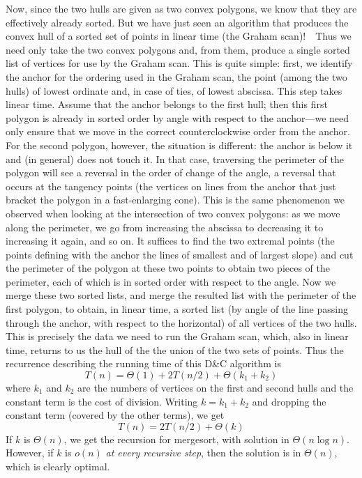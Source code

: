 \documentclass[11pt]{article}
\begin{document}
Now, since the two hulls are given as two convex polygons, we know that
they are effectively already sorted.  But we have just seen an algorithm
that produces the convex hull of a sorted set of points in linear time
(the Graham scan)!\ \  Thus we need only take the two convex polygons
and, from them, produce a single sorted list of vertices for use by the
Graham scan.  This is quite simple: first, we identify the anchor for the
ordering used in the Graham scan, the point (among the two hulls) of lowest
ordinate and, in case of ties, of lowest abscissa.  This step takes linear
time.  Assume that the anchor belongs to the first hull; then this first
polygon is already in sorted order by angle with respect to the anchor---we
need only ensure that we move in the correct counterclockwise order from the
anchor.  For the second polygon, however, the situation is different:
the anchor is below it and (in general) does not touch it.  In that case,
traversing the perimeter of the polygon will see a reversal in the order of
change of the angle, a reversal that occurs at the tangency points (the vertices
on lines from the anchor that just bracket the polygon in a fast-enlarging
cone).  This is the same phenomenon we observed when looking at the intersection
of two convex polygons: as we move along the perimeter, we go from increasing
the abscissa to decreasing it to increasing it again, and so on.  It suffices
to find the two extremal points (the points defining with the anchor the
lines of smallest and of largest slope) and cut the perimeter of the polygon
at these two points to obtain two pieces of the perimeter, each of which
is in sorted order with respect to the angle.  Now we merge these two
sorted lists, and merge the resulted list with the perimeter of the first
polygon, to obtain, in linear time, a sorted list (by angle of the line
passing through the anchor, with respect to the horizontal) of all
vertices of the two hulls.  This is precisely the data we need to run
the Graham scan, which, also in linear time, returns to us the hull of the
the union of the two sets of points.  Thus the recurrence describing the running
time of this D\&{}C algorithm is 
  $$T(n) = \Theta(1) + 2T(n/2) + \Theta(k_1+k_2)$$
where $k_1$ and $k_2$ are the numbers of vertices on the first and second
hulls and the constant term is the cost of division.  Writing  $k=k_1+k_2$
and dropping the constant term (covered by the other terms), we get
  $$T(n) = 2T(n/2) + \Theta(k)$$
If $k$ is $\Theta(n)$, we get the recursion for mergesort, with solution
in $\Theta(n\log n)$.  However, if $k$ is $o(n)$ \emph{at every
recursive step}, then the solution is in $\Theta(n)$, which is clearly optimal.
\end{document}
